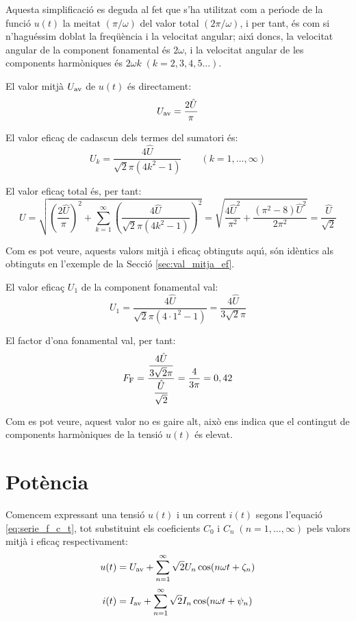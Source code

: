 \begin{exemple}
Aquesta simplificaci\'{o} es deguda al fet que s'ha utilitzat com a
per\'{\i}ode de la funci\'{o} $u(t)$ la meitat $(\pi/\omega)$ del valor total
$(2\pi/\omega)$, i per tant, \'{e}s com si n'hagu\'{e}ssim doblat la
freq\"{u}\`{e}ncia i la velocitat angular; aix\'{\i} doncs, la velocitat angular
de la component fonamental \'{e}s $2\omega$, i la velocitat angular de
les components harm\`{o}niques \'{e}s $2\omega k \;(k=2,3,4,5\ldots)$.

El valor mitj\`{a} $U_\mathrm{av}$ de $u(t)$ \'{e}s directament:
\[
    U_\mathrm{av} = \frac{2\hat{U}}{\pi}
\]

El valor efica\c{c} de cadascun dels termes del sumatori \'{e}s:
\[
    U_k =\frac{4\hat{U}}{\sqrt{2}\pi(4k^2-1)}
    \qquad(k=1,\ldots,\infty)
\]

El valor efica\c{c} total \'{e}s, per tant:
\[
    U=\sqrt{\left(\frac{2\hat{U}}{\pi}\right)^2 + \sum_{k=1}^\infty
    \left(\frac{4\hat{U}}{\sqrt{2}\pi(4k^2-1)}\right)^2} =
    \sqrt{\frac{4\hat{U}^2}{\pi^2} + \frac{(\pi^2-8)\hat{U}^2}{2\pi^2}
    }= \frac{\hat{U}}{\sqrt{2}}
\]

Com es pot veure, aquests valors mitj\`{a} i efica\c{c} obtinguts aqu\'{\i}, s\'{o}n
id\`{e}ntics als obtinguts en l'exemple de la Secci\'{o}
\ref{sec:val_mitja_ef}.

El valor efica\c{c} $U_1$ de la component fonamental val:
\[
    U_1 =\frac{4\hat{U}}{\sqrt{2}\pi(4\cdot 1^2-1)} =
    \frac{4\hat{U}}{3\sqrt{2}\pi}
\]

El factor d'ona fonamental val, per tant:
\[
    F_\mathrm{F} =
    \frac{\dfrac{4\hat{U}}{3\sqrt{2}\pi}}{\dfrac{\hat{U}}{\sqrt{2}}}
    =\frac{4}{3\pi} = 0,{42}
\]

Com es pot veure, aquest valor no es gaire alt, aix\`{o} ens indica que
el contingut de components harm\`{o}niques de la tensi\'{o} $u(t)$ \'{e}s
elevat.

\end{exemple}

\section{Pot\`{e}ncia}

Comencem expressant una tensi\'{o} $u(t)$ i un corrent $i(t)$
 segons l'equaci\'{o} \eqref{eq:serie_f_c_t}, tot substituint els
 coeficients $C_0$ i $C_n \;(n=1,\ldots,\infty)$ pels valors mitj\`{a} i efica\c{c}
 respectivament:
 \begin{align}
    u(t)  &= U_\mathrm{av} + \sum_{n=1}^\infty \sqrt{2} U_n \cos (n \omega t +
    \zeta_n)\\[0.5ex]
    i(t)  &= I_\mathrm{av} + \sum_{n=1}^\infty \sqrt{2} I_n \cos (n \omega t + \psi_n)
 \end{align}

